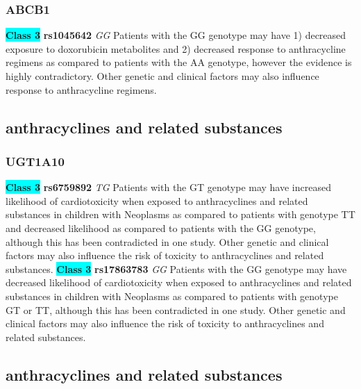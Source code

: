 \documentclass{book}
\begin{document}
\subsubsection{ ABCB1 }

\begin{center}
\textbf{\colorbox{cyan} {Class 3}} \textbf{ rs1045642 } \textit{ GG }
Patients with the GG genotype may have 1) decreased exposure to doxorubicin metabolites and 2) decreased response to anthracycline regimens as compared to patients with the AA genotype, however the evidence is highly contradictory. Other genetic and clinical factors may also influence response to anthracycline regimens.


\end{center}\subsection{ anthracyclines and related substances }


\subsubsection{ UGT1A10 }

\begin{center}
\textbf{\colorbox{cyan} {Class 3}} \textbf{ rs6759892 } \textit{ TG }
Patients with the GT genotype may have increased likelihood of cardiotoxicity when exposed to anthracyclines and related substances in children with Neoplasms as compared to patients with genotype TT and decreased likelihood as compared to patients with the GG genotype, although this has been contradicted in one study. Other genetic and clinical factors may also influence the risk of toxicity to anthracyclines and related substances. \textbf{\colorbox{cyan} {Class 3}} \textbf{ rs17863783 } \textit{ GG }
Patients with the GG genotype may have decreased likelihood of cardiotoxicity when exposed to anthracyclines and related substances in children with Neoplasms as compared to patients with genotype GT or TT, although this has been contradicted in one study. Other genetic and clinical factors may also influence the risk of toxicity to anthracyclines and related substances.



\end{center}\subsection{ anthracyclines and related substances }
\end{document}
